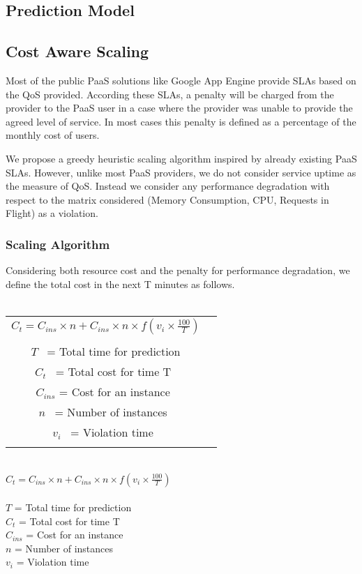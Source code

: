 \subsection{Prediction Model}

\subsection{Cost Aware Scaling}
Most of the public PaaS solutions like Google App Engine provide SLAs based on the QoS provided. According these SLAs, a penalty will be charged from the provider to the PaaS user in a case where the provider was unable to provide the agreed level of service. In most cases this penalty is defined as a percentage of the monthly cost of users.

We propose a greedy heuristic scaling algorithm inspired by already existing PaaS SLAs. However, unlike most PaaS providers, we do not consider service uptime as the measure of QoS. Instead we consider any performance degradation with respect to the matrix considered (Memory Consumption, CPU, Requests in Flight) as a violation.

\subsubsection{Scaling Algorithm}
Considering both resource cost and the penalty for performance degradation, we define the total cost in the next T minutes as follows.\\
\\
\begin{table} 
    \begin{tabular}{ c c }
        \textbf{$ C_t = C_{ins} \times n  +  C_{ins} \times n \times f(v_i \times \frac{100}{T}) $} \\\\$ T $  = Total time for prediction \\$ C_t $  = Total cost for time T  \\$ C_{ins} $ = Cost for an instance \\$ n $  = Number of instances  \\$ v_i $  = Violation time  \\ &  \\ 
    \end{tabular} 
\end{table}
\\
\textbf{$ C_t = C_{ins} \times n  +  C_{ins} \times n \times f(v_i \times \frac{100}{T}) $} \\
\\
$T$       = Total time for prediction \\
$C_t $    = Total cost for time T  \\
$C_{ins}$ = Cost for an instance   \\
$n$       = Number of instances  \\
$v_i$     = Violation time  \\
\\

